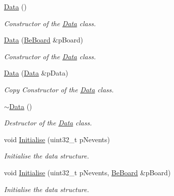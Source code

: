\begin{DoxyCompactItemize}
\item 
\hyperlink{class_ph2___hw_interface_1_1_data_a72e6b3c8af444dd82569d3a47f89812c}{Data} ()
\begin{DoxyCompactList}\small\item\em Constructor of the \hyperlink{class_ph2___hw_interface_1_1_data}{Data} class. \end{DoxyCompactList}\item 
\hyperlink{class_ph2___hw_interface_1_1_data_aa98dbf6219ca78afda306b2fa41dbcc5}{Data} (\hyperlink{class_ph2___hw_description_1_1_be_board}{Be\-Board} \&p\-Board)
\begin{DoxyCompactList}\small\item\em Constructor of the \hyperlink{class_ph2___hw_interface_1_1_data}{Data} class. \end{DoxyCompactList}\item 
\hyperlink{class_ph2___hw_interface_1_1_data_aefcb0c450523abe1c4397189f64a3aff}{Data} (\hyperlink{class_ph2___hw_interface_1_1_data}{Data} \&p\-Data)
\begin{DoxyCompactList}\small\item\em Copy Constructor of the \hyperlink{class_ph2___hw_interface_1_1_data}{Data} class. \end{DoxyCompactList}\item 
\hyperlink{class_ph2___hw_interface_1_1_data_a889228098e5c0b4eb5d06ad7850cdd7e}{$\sim$\-Data} ()
\begin{DoxyCompactList}\small\item\em Destructor of the \hyperlink{class_ph2___hw_interface_1_1_data}{Data} class. \end{DoxyCompactList}\item 
void \hyperlink{class_ph2___hw_interface_1_1_data_ab3a85993abf1f3981ab917b5f87c4000}{Initialise} (uint32\-\_\-t p\-Nevents)
\begin{DoxyCompactList}\small\item\em Initialise the data structure. \end{DoxyCompactList}\item 
void \hyperlink{class_ph2___hw_interface_1_1_data_a4d6bcb42ecdaa4b5763a3b8279f22599}{Initialise} (uint32\-\_\-t p\-Nevents, \hyperlink{class_ph2___hw_description_1_1_be_board}{Be\-Board} \&p\-Board)
\begin{DoxyCompactList}\small\item\em Initialise the data structure. \end{DoxyCompactList}\item 

\end{DoxyCompactItemize}
